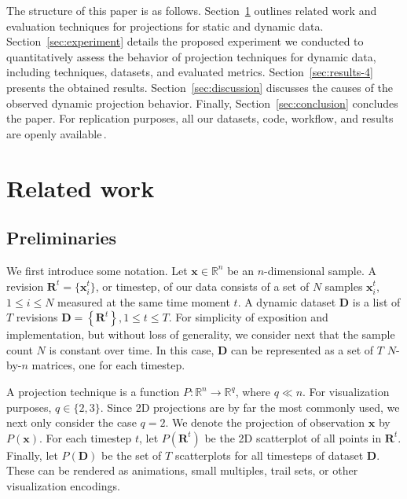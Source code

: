 The structure of this paper is as follows. Section~\ref{sec:related} outlines related work and evaluation techniques for projections for static and dynamic data. Section~\ref{sec:experiment} details the proposed experiment we conducted to quantitatively assess the behavior of projection techniques for dynamic data, including techniques, datasets, and evaluated metrics. Section~\ref{sec:results-4} presents the obtained results. Section~\ref{sec:discussion} discusses the causes of the observed dynamic projection behavior. Finally, Section~\ref{sec:conclusion} concludes the paper. For replication purposes, all our datasets, code, workflow, and results are openly available\,\citep{repo}.


\section{Related work}
\label{sec:related}

\subsection{Preliminaries}
\label{sec:preliminaries}
%
We first introduce some notation. Let
$\mathbf{x} \in \mathbb{R}^n$
be an $n$-dimensional sample. A revision $\mathbf{R}^t = \{\mathbf{x}_i^t\}$, or timestep, of our data consists of a set of $N$ samples $\mathbf{x}_i^t$, $1 \leq i \leq N$ measured at the same time moment $t$. A dynamic dataset $\mathbf{D}$ is a list of $T$ revisions $\mathbf{D}=\left \{ \mathbf{R}^{t} \right \}, 1 \leq t \leq T$. For simplicity of exposition and implementation, but without loss of generality, we consider next that the sample count $N$ is constant over time. In this case, $\mathbf{D}$ can be represented as a set of $T$ $N$-by-$n$ matrices, one for each timestep.

A projection technique is a function $P: \mathbb{R}^{n} \rightarrow \mathbb{R}^{q}$, where $q \ll n$. For visualization purposes, $q \in \{2,3\}$. Since 2D projections are by far the most commonly used, we next only consider the case $q=2$. We denote the projection of observation $\mathbf{x}$ by $P(\mathbf{x})$. For each timestep $t$, let $P(\mathbf{R}^{t})$ be the 2D scatterplot of all points in
$\mathbf{R}^{t}$. Finally, let $P(\mathbf{D})$ be the set of $T$ scatterplots for all timesteps of dataset $\mathbf{D}$. These can be rendered as animations, small multiples, trail sets, or other visualization encodings.

